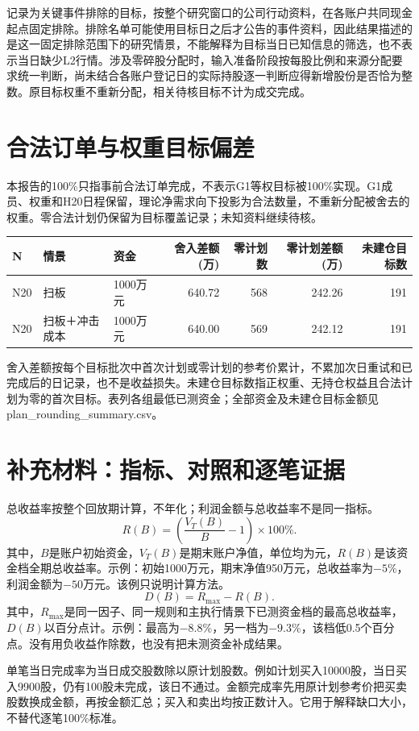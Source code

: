 \documentclass[UTF8,10pt,a4paper,fontset=fandol]{ctexart}
\begin{document}
记录为关键事件排除的目标，按整个研究窗口的公司行动资料，在各账户共同现金起点固定排除。排除名单可能使用目标日之后才公告的事件资料，因此结果描述的是这一固定排除范围下的研究情景，不能解释为目标当日已知信息的筛选，也不表示当日缺少L2行情。涉及零碎股分配时，输入准备阶段按每股比例和来源分配要求统一判断，尚未结合各账户登记日的实际持股逐一判断应得新增股份是否恰为整数。原目标权重不重新分配，相关待核目标不计为成交完成。\section*{合法订单与权重目标偏差}本报告的100\%只指事前合法订单完成，不表示G1等权目标被100\%实现。G1成员、权重和H20日程保留，理论净需求向下投影为合法数量，不重新分配被舍去的权重。零合法计划仍保留为目标覆盖记录；未知资料继续待核。\begin{table}[H]\centering\scriptsize\begin{tabular}{lllrrrr}\toprule N & 情景 & 资金 & 舍入差额(万) & 零计划数 & 零计划差额(万) & 未建仓目标数\\\midrule N20 & 扫板 & 1000万元 & 640.72 & 568 & 242.26 & 191 \\
N20 & 扫板＋冲击成本 & 1000万元 & 640.00 & 569 & 242.12 & 191 \\\bottomrule\end{tabular}\end{table}舍入差额按每个目标批次中首次计划或零计划的参考价累计，不累加次日重试和已完成后的日记录，也不是收益损失。未建仓目标数指正权重、无持仓权益且合法计划为零的首次目标。表列各组最低已测资金；全部资金及未建仓目标金额见plan\_rounding\_summary.csv。

\section*{补充材料：指标、对照和逐笔证据}
总收益率按整个回放期计算，不年化；利润金额与总收益率不是同一指标。
\[
R(B)=\left(\frac{V_T(B)}{B}-1\right)\times100\%.
\]
其中，$B$是账户初始资金，$V_T(B)$是期末账户净值，单位均为元，$R(B)$是该资金档全期总收益率。示例：初始1000万元，期末净值950万元，总收益率为$-5\%$，利润金额为$-50$万元。该例只说明计算方法。
\[
D(B)=R_{\max}-R(B).
\]
其中，$R_{\max}$是同一因子、同一规则和主执行情景下已测资金档的最高总收益率，$D(B)$以百分点计。示例：最高为$-8.8\%$，另一档为$-9.3\%$，该档低0.5个百分点。没有用负收益作除数，也没有把未测资金补成结果。

单笔当日完成率为当日成交股数除以原计划股数。例如计划买入10000股，当日买入9900股，仍有100股未完成，该日不通过。金额完成率先用原计划参考价把买卖股数换成金额，再按金额汇总；买入和卖出均按正数计入。它用于解释缺口大小，不替代逐笔100\%标准。
\end{document}

